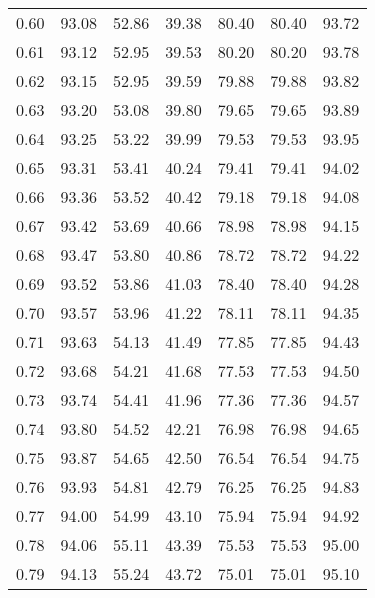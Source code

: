 \begin{tabular}{|c|c|c|c|c|c|c|}
      0.60 &     93.08 &     52.86 &      39.38 &   80.40 &      80.40 &         93.72 \\
      0.61 &     93.12 &     52.95 &      39.53 &   80.20 &      80.20 &         93.78 \\
      0.62 &     93.15 &     52.95 &      39.59 &   79.88 &      79.88 &         93.82 \\
      0.63 &     93.20 &     53.08 &      39.80 &   79.65 &      79.65 &         93.89 \\
      0.64 &     93.25 &     53.22 &      39.99 &   79.53 &      79.53 &         93.95 \\
      0.65 &     93.31 &     53.41 &      40.24 &   79.41 &      79.41 &         94.02 \\
      0.66 &     93.36 &     53.52 &      40.42 &   79.18 &      79.18 &         94.08 \\
      0.67 &     93.42 &     53.69 &      40.66 &   78.98 &      78.98 &         94.15 \\
      0.68 &     93.47 &     53.80 &      40.86 &   78.72 &      78.72 &         94.22 \\
      0.69 &     93.52 &     53.86 &      41.03 &   78.40 &      78.40 &         94.28 \\
      0.70 &     93.57 &     53.96 &      41.22 &   78.11 &      78.11 &         94.35 \\
      0.71 &     93.63 &     54.13 &      41.49 &   77.85 &      77.85 &         94.43 \\
      0.72 &     93.68 &     54.21 &      41.68 &   77.53 &      77.53 &         94.50 \\
      0.73 &     93.74 &     54.41 &      41.96 &   77.36 &      77.36 &         94.57 \\
      0.74 &     93.80 &     54.52 &      42.21 &   76.98 &      76.98 &         94.65 \\
      0.75 &     93.87 &     54.65 &      42.50 &   76.54 &      76.54 &         94.75 \\
      0.76 &     93.93 &     54.81 &      42.79 &   76.25 &      76.25 &         94.83 \\
      0.77 &     94.00 &     54.99 &      43.10 &   75.94 &      75.94 &         94.92 \\
      0.78 &     94.06 &     55.11 &      43.39 &   75.53 &      75.53 &         95.00 \\
      0.79 &     94.13 &     55.24 &      43.72 &   75.01 &      75.01 &         95.10 \\

\end{tabular}

